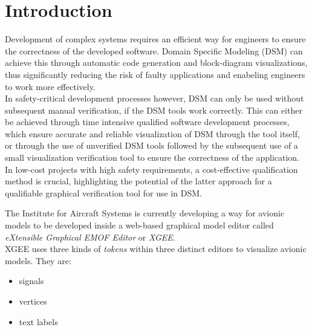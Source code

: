 \chapter{Introduction}
\label{chp:introduction}

Development of complex systems requires an efficient way for engineers to ensure the correctness of the developed software. Domain Specific Modeling (DSM) can achieve this through automatic code generation and block-diagram visualizations, thus significantly reducing the risk of faulty applications and enabeling engineers to work more effectively.\\
In safety-critical development processes however, DSM can only be used without subsequent manual verification, if the DSM tools work correctly. This can either be achieved through time intensive qualified software development processes, which ensure accurate and reliable visualization of DSM through the tool itself, or through the use of unverified DSM tools followed by the subsequent use of a small visualization verification tool to ensure the correctness of the application.\\
In low-cost projects with high safety requirements, a cost-effective qualification method is crucial, highlighting the potential of the latter approach for a qualifiable graphical verification tool for use in DSM.

The Institute for Aircraft Systems is currently developing a way for avionic models to be developed inside a web-based graphical model editor called \textit{eXtensible Graphical EMOF Editor} or \textit{XGEE}.\\
XGEE uses three kinds of \textit{tokens} within three distinct editors to visualize avionic models. They are:
\begin{itemize}
    \item signals
    \item vertices
    \item text labels
\end{itemize}


